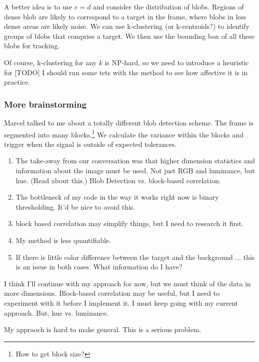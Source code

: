 \documentclass[letter]{article}
\newcounter{foot}
\begin{document}
A better idea is to use $e = d$ and consider the distribution of blobs. Regions of dense
blob are likely to correspond to a target in the frame, where blobs in less dense areas 
are likely noise. We can use k-clustering (or k-centroids?) to identify groups of blobs
that comprise a target. We then use the bounding box of all these blobs for tracking. 

Of course, k-clustering for any $k$ is NP-hard, so we need to introduce a heuristic for
[TODO] I should run some tets with the method to see how affective it is in practice. 

\subsubsection{More brainstorming} 
Marcel talked to me about a totally different blob detection scheme. The frame is 
segmented into many blocks.\footnote{How to get block size?} We calculate the variance 
within the blocks and trigger when the signal is outside of expected tolerances. 

\begin{enumerate}
\item The take-away from our conversation was that higher dimension statistics and information
about the image must be used. Not just RGB and luminance, but hue. (Read about this.) 
Blob Detection vs. block-based correlation.

\item The bottleneck of my code in the way it works right now is binary thresholding. It'd be 
nice to avoid this. 

\item block based correlation may simplify things, but I need to research it first. 

\item My method is less quantifiable. 

\item If there is little color difference between the target and the background ... this is an
issue in both cases. What information do I have? 
\end{enumerate}

I think I'll continue with my approach for now, but we must think of the data in more dimensions. 
Block-based correlation may be useful, but I need to experiment with it before I implement it. 
I must keep going with my current approach. But, hue vs. luminance. 

My appraoch is hard to make general. This is a serious problem.  
\end{document}
